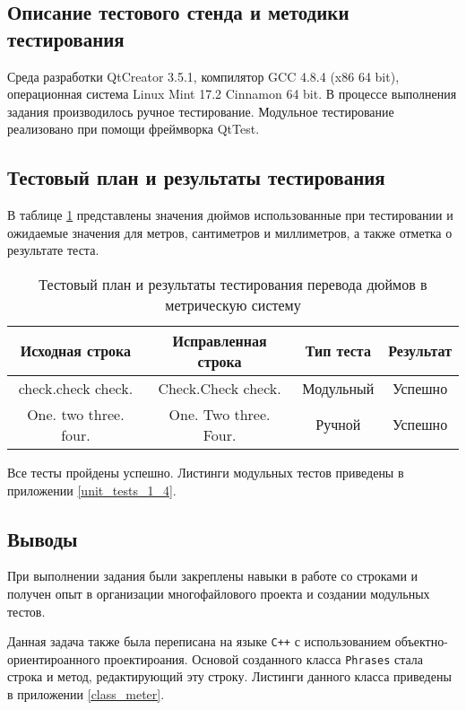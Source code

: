 \documentclass[12pt,a4paper]{report}
\begin{document}
\subsection{Описание тестового стенда и методики тестирования}
\hspace{\parindent}Среда разработки QtCreator 3.5.1, компилятор GCC 4.8.4 (x86 64 bit), операционная система Linux Mint 17.2 Cinnamon 64 bit.
В процессе выполнения задания производилось ручное тестирование.
Модульное тестирование реализовано при помощи фреймворка QtTest.

\subsection{Тестовый план и результаты тестирования}
\hspace{\parindent}В таблице \ref{inch_to_cm_test_plan} представлены значения дюймов использованные при тестировании и ожидаемые значения для метров, сантиметров и миллиметров, а также отметка о результате теста.
\FloatBarrier
\begin{table}[h]
\caption{Тестовый план и результаты тестирования перевода дюймов в метрическую систему}
\label{inch_to_cm_test_plan}
\begin{tabular}{| c | c | c | c |}
\hline 
Исходная строка & Исправленная строка & Тип теста & Результат\\ 
\hline 
check.check check.& Check.Check check. & Модульный & Успешно \\ 
\hline 
One. two three. four. & One. Two three. Four. & Ручной & Успешно \\ 
\hline 
\end{tabular} 
\end{table}
\FloatBarrier
Все тесты пройдены успешно. Листинги модульных тестов приведены в приложении \ref{unit_tests_1_4}.
\subsection{Выводы}
\hspace{\parindent}При выполнении задания были закреплены навыки в работе со строками и получен опыт в организации многофайлового проекта и создании модульных тестов.

Данная задача также была переписана на языке \verb|C++| с использованием объектно-ориентироанного проектироания. Основой созданного класса \verb+Phrases+ стала строка и метод, редактирующий эту строку. Листинги данного класса приведены в приложении \ref{class_meter}.
\end{document}

